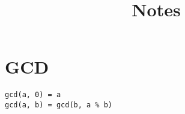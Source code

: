 \documentclass[a4paper,9pt]{article}
\title{Notes}
\begin{document}
\section{GCD}

\begin{lstlisting}
gcd(a, 0) = a
gcd(a, b) = gcd(b, a % b)
\end{lstlisting}
\end{document}
